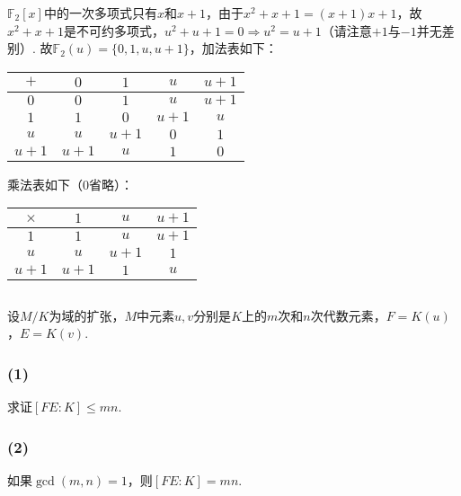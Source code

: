 \jie $\mathbb{F}_2[x]$中的一次多项式只有$x$和$x+1$，由于$x^2+x+1=(x+1)x+1$，故$x^2+x+1$是不可约多项式，$u^2+u+1=0\Rightarrow u^2=u+1$（请注意$+1$与$-1$并无差别）. 故$\mathbb{F}_2(u)=\{0,1,u,u+1\}$，加法表如下：
\begin{center}
	\begin{tabular}{|c|c|c|c|c|}
		\hline
		$+$ & $0$ & $1$ & $u$ & $u+1$\\
		\hline
		$0$ & $0$ & $1$ & $u$ & $u+1$\\
		\hline
		$1$ & $1$ & $0$ & $u+1$ & $u$\\
		\hline
		$u$ & $u$ & $u+1$ & $0$ & $1$\\
		\hline
		$u+1$ & $u+1$ & $u$ & $1$ & $0$\\
		\hline
	\end{tabular}
\end{center}
乘法表如下（$0$省略）：
\begin{center}
	\begin{tabular}{|c|c|c|c|}
		\hline
		$\times$ & $1$ & $u$ & $u+1$\\
		\hline
		$1$ & $1$ & $u$ & $u+1$\\
		\hline
		$u$ & $u$ & $u+1$ & $1$\\
		\hline
		$u+1$ & $u+1$ & $1$ & $u$\\
		\hline
	\end{tabular}
\end{center}

\subsection{}
设$M/K$为域的扩张，$M$中元素$u,v$分别是$K$上的$m$次和$n$次代数元素，$F=K(u)$，$E=K(v)$.
\subsubsection{(1)}
求证$[FE:K]\leq mn$.

\subsubsection{(2)}
如果$\gcd(m,n)=1$，则$[FE:K]=mn$.



